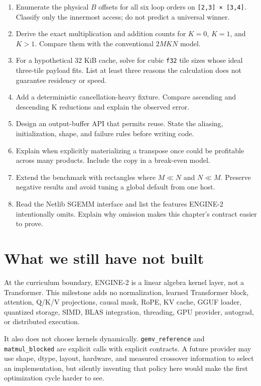 \begin{enumerate}
\def\labelenumi{\arabic{enumi}.}
\tightlist
\item
  Enumerate the physical \(B\) offsets for all six loop orders on
  \texttt{{[}2,3{]}\ ×\ {[}3,4{]}}. Classify only the innermost access;
  do not predict a universal winner.
\item
  Derive the exact multiplication and addition counts for \(K=0\),
  \(K=1\), and \(K>1\). Compare them with the conventional \(2MKN\)
  model.
\item
  For a hypothetical 32 KiB cache, solve for cubic \texttt{f32} tile
  sizes whose ideal three-tile payload fits. List at least three reasons
  the calculation does not guarantee residency or speed.
\item
  Add a deterministic cancellation-heavy fixture. Compare ascending and
  descending K reductions and explain the observed error.
\item
  Design an output-buffer API that permits reuse. State the aliasing,
  initialization, shape, and failure rules before writing code.
\item
  Explain when explicitly materializing a transpose once could be
  profitable across many products. Include the copy in a break-even
  model.
\item
  Extend the benchmark with rectangles where \(M\ll N\) and \(N\ll M\).
  Preserve negative results and avoid tuning a global default from one
  host.
\item
  Read the Netlib SGEMM interface and list the features ENGINE-2
  intentionally omits. Explain why omission makes this chapter's
  contract easier to prove.
\end{enumerate}

\section{What we still have not
built}\label{what-we-still-have-not-built-1}

At the  curriculum boundary, ENGINE-2 is a linear algebra
kernel layer, not a Transformer. This milestone adds no normalization,
learned Transformer block, attention, Q/K/V projections, causal mask,
RoPE, KV cache, GGUF loader, quantized storage, SIMD, BLAS integration,
threading, GPU provider, autograd, or distributed execution.

It also does not choose kernels dynamically. \texttt{gemv\_reference}
and \texttt{matmul\_blocked} are explicit calls with explicit contracts.
A future provider may use shape, dtype, layout, hardware, and measured
crossover information to select an implementation, but silently
inventing that policy here would make the first optimization cycle
harder to see.

